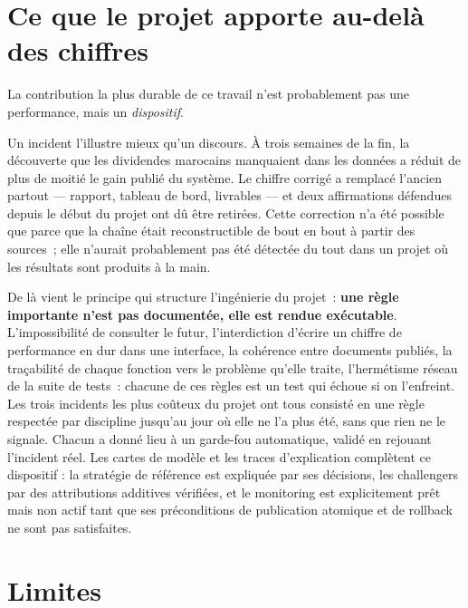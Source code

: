 \section*{Ce que le projet apporte au-delà des chiffres}

La contribution la plus durable de ce travail n'est probablement pas une
performance, mais un \emph{dispositif}.

Un incident l'illustre mieux qu'un discours. À trois semaines de la fin, la
découverte que les dividendes marocains manquaient dans les données a réduit de
plus de moitié le gain publié du système. Le chiffre corrigé a remplacé l'ancien
partout — rapport, tableau de bord, livrables — et deux affirmations défendues
depuis le début du projet ont dû être retirées. Cette correction n'a été possible
que parce que la chaîne était reconstructible de bout en bout à partir des
sources~; elle n'aurait probablement pas été détectée du tout dans un projet où
les résultats sont produits à la main.

De là vient le principe qui structure l'ingénierie du projet~: \textbf{une règle
importante n'est pas documentée, elle est rendue exécutable}. L'impossibilité de
consulter le futur, l'interdiction d'écrire un chiffre de performance en dur dans
une interface, la cohérence entre documents publiés, la traçabilité de chaque
fonction vers le problème qu'elle traite, l'hermétisme réseau de la suite de
tests~: chacune de ces règles est un test qui échoue si on l'enfreint. Les trois
incidents les plus coûteux du projet ont tous consisté en une règle respectée par
discipline jusqu'au jour où elle ne l'a plus été, sans que rien ne le signale.
Chacun a donné lieu à un garde-fou automatique, validé en rejouant l'incident
réel. Les cartes de modèle et les traces d'explication complètent ce dispositif :
la stratégie de référence est expliquée par ses décisions, les challengers par
des attributions additives vérifiées, et le monitoring est explicitement prêt
mais non actif tant que ses préconditions de publication atomique et de rollback
ne sont pas satisfaites.

\section*{Limites}

